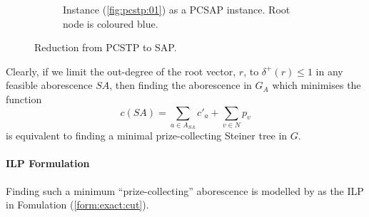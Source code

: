 \begin{figure}[h]
\begin{subfigure}[t]{0.47\linewidth}
    \caption{Instance (\ref{fig:pcstp:01}) as a PCSAP instance. Root node is coloured blue.}
  \end{subfigure}
  \caption{Reduction from PCSTP to SAP.}
  \label{fig:pcstptosap}
\end{figure}

Clearly, if we
limit the out-degree of the root vector, $r$, to $\delta^+(r) \leq 1$ in any feasible
aborescence $SA$, then finding the aborescence in $G_A$ which minimises the function
$$c(SA) = \sum_{a \in A_{SA}} c'_{a} + \sum_{v \in N} p_v$$
is equivalent to finding a minimal prize-collecting Steiner tree in $G$.

\paragraph{ILP Formulation}

Finding such a minimum ``prize-collecting'' aborescence is modelled by \citet{ljubic2005solving}
as the ILP in Fomulation (\ref{form:exact:cut}).

